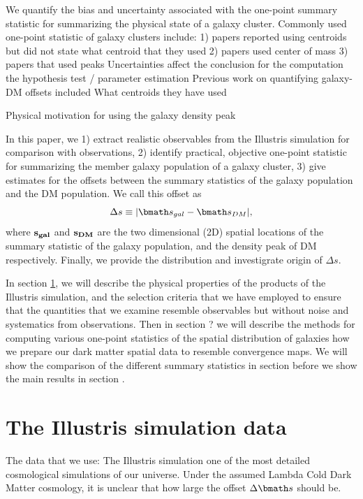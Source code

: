 \documentclass[usenatbib]{mn2e}
\renewcommand{\vec}[1]{ {\bmath #1} }
\begin{document}
We quantify the bias and uncertainty associated with the one-point summary
statistic for summarizing the physical state of a galaxy cluster. 
Commonly used one-point statistic of galaxy clusters include:
1) papers reported using centroids but did not state what centroid that they
used 
2) papers used center of mass 
3) papers that used peaks  
Uncertainties affect the conclusion for the computation the hypothesis test / parameter
estimation
Previous work on quantifying galaxy-DM offsets included  
What centroids they have used

Physical motivation for using the galaxy density peak 

In this paper, we 
1) extract realistic observables from the Illustris simulation for
comparison with observations, 2) identify practical, objective one-point statistic for 
summarizing the member galaxy population of a galaxy cluster, 3)	
give estimates for the offsets between the summary statistics of the galaxy  
population and the DM population. We call this offset as 
\begin{equation}
	\Delta s \equiv |\vec{s}_{gal} - \vec{s}_{DM}|,
\end{equation}
where $\bf{s}_{gal}$ and $\bf{s}_{DM}$ are the two dimensional (2D) spatial
locations of the summary statistic of the galaxy population, and the density
peak of DM respectively. 
Finally, we provide the distribution and investigrate origin of $\Delta s$. 



In section \ref{sec:illustris_sim},
we will describe the physical properties of the products of the Illustris
simulation, and the selection criteria that we have employed to ensure that the
quantities that we examine resemble observables but without noise and
systematics from observations. Then in section ? we will describe the methods for computing various 
one-point statistics of the spatial distribution of galaxies how we prepare our dark
matter spatial data to resemble convergence maps. We will show the comparison
of the different summary statistics in section before we show the main results
in section . 

\section{The Illustris simulation data} 
\label{sec:illustris_sim}
The data that we use: The Illustris simulation 
one of the most detailed cosmological simulations of our universe. 
Under the assumed Lambda Cold Dark Matter cosmology, it is unclear 
that how large the offset $\Delta \vec{s}$ should be. 
\end{document}
